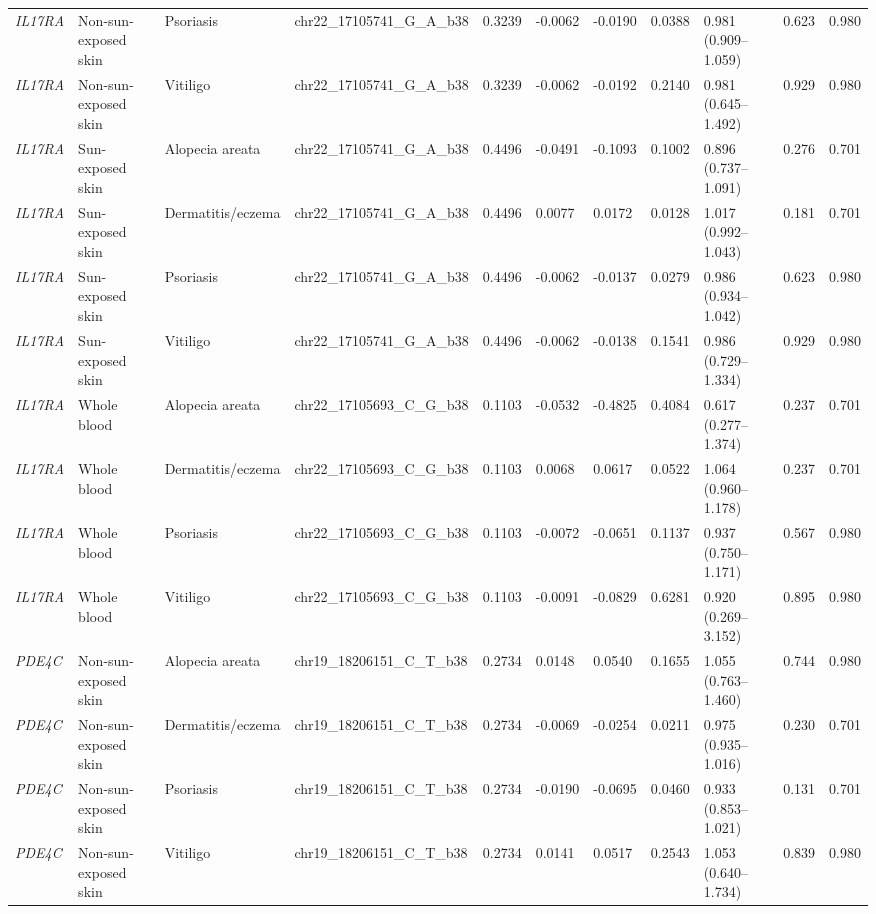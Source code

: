 \documentclass[10pt,a4paper]{article}
\begin{document}
\begin{landscape}
\begin{longtable}{p{1.5cm}p{2.7cm}p{2.5cm}p{4.2cm}p{1.5cm}p{1.5cm}p{1.5cm}p{1.4cm}p{3.4cm}p{1.8cm}p{1.8cm}}
\textit{IL17RA} & Non-sun-exposed skin & Psoriasis & chr22\_17105741\_G\_A\_b38 & 0.3239 & -0.0062 & -0.0190 & 0.0388 & 0.981 (0.909--1.059) & 0.623 & 0.980 \\
\textit{IL17RA} & Non-sun-exposed skin & Vitiligo & chr22\_17105741\_G\_A\_b38 & 0.3239 & -0.0062 & -0.0192 & 0.2140 & 0.981 (0.645--1.492) & 0.929 & 0.980 \\
\textit{IL17RA} & Sun-exposed skin & Alopecia areata & chr22\_17105741\_G\_A\_b38 & 0.4496 & -0.0491 & -0.1093 & 0.1002 & 0.896 (0.737--1.091) & 0.276 & 0.701 \\
\textit{IL17RA} & Sun-exposed skin & Dermatitis/eczema & chr22\_17105741\_G\_A\_b38 & 0.4496 & 0.0077 & 0.0172 & 0.0128 & 1.017 (0.992--1.043) & 0.181 & 0.701 \\
\textit{IL17RA} & Sun-exposed skin & Psoriasis & chr22\_17105741\_G\_A\_b38 & 0.4496 & -0.0062 & -0.0137 & 0.0279 & 0.986 (0.934--1.042) & 0.623 & 0.980 \\
\textit{IL17RA} & Sun-exposed skin & Vitiligo & chr22\_17105741\_G\_A\_b38 & 0.4496 & -0.0062 & -0.0138 & 0.1541 & 0.986 (0.729--1.334) & 0.929 & 0.980 \\
\textit{IL17RA} & Whole blood & Alopecia areata & chr22\_17105693\_C\_G\_b38 & 0.1103 & -0.0532 & -0.4825 & 0.4084 & 0.617 (0.277--1.374) & 0.237 & 0.701 \\
\textit{IL17RA} & Whole blood & Dermatitis/eczema & chr22\_17105693\_C\_G\_b38 & 0.1103 & 0.0068 & 0.0617 & 0.0522 & 1.064 (0.960--1.178) & 0.237 & 0.701 \\
\textit{IL17RA} & Whole blood & Psoriasis & chr22\_17105693\_C\_G\_b38 & 0.1103 & -0.0072 & -0.0651 & 0.1137 & 0.937 (0.750--1.171) & 0.567 & 0.980 \\
\textit{IL17RA} & Whole blood & Vitiligo & chr22\_17105693\_C\_G\_b38 & 0.1103 & -0.0091 & -0.0829 & 0.6281 & 0.920 (0.269--3.152) & 0.895 & 0.980 \\
\textit{PDE4C} & Non-sun-exposed skin & Alopecia areata & chr19\_18206151\_C\_T\_b38 & 0.2734 & 0.0148 & 0.0540 & 0.1655 & 1.055 (0.763--1.460) & 0.744 & 0.980 \\
\textit{PDE4C} & Non-sun-exposed skin & Dermatitis/eczema & chr19\_18206151\_C\_T\_b38 & 0.2734 & -0.0069 & -0.0254 & 0.0211 & 0.975 (0.935--1.016) & 0.230 & 0.701 \\
\textit{PDE4C} & Non-sun-exposed skin & Psoriasis & chr19\_18206151\_C\_T\_b38 & 0.2734 & -0.0190 & -0.0695 & 0.0460 & 0.933 (0.853--1.021) & 0.131 & 0.701 \\
\textit{PDE4C} & Non-sun-exposed skin & Vitiligo & chr19\_18206151\_C\_T\_b38 & 0.2734 & 0.0141 & 0.0517 & 0.2543 & 1.053 (0.640--1.734) & 0.839 & 0.980 \\

\end{longtable}
\end{landscape}
\end{document}
